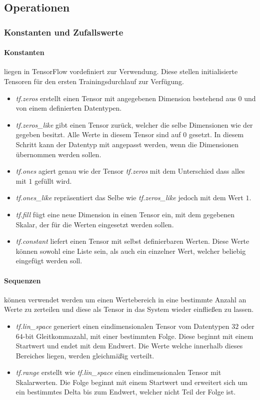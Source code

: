 \subsection{Operationen}

\subsubsection{Konstanten und Zufallswerte}

\paragraph{Konstanten} liegen in TensorFlow vordefiniert zur Verwendung.
Diese stellen initialisierte Tensoren für den ersten Trainingsdurchlauf zur Verfügung.

\begin{itemize}
	\item \textit{tf.zeros} erstellt einen Tensor mit angegebenen Dimension bestehend aus $0$ und von einem definierten Datentypen. 
	\item \textit{tf.zeros\_like} gibt einen Tensor zurück, welcher die selbe Dimensionen wie der gegeben besitzt.
	Alle Werte in diesem Tensor sind auf $0$ gesetzt.
	In diesem Schritt kann der Datentyp mit angepasst werden, wenn die Dimensionen übernommen werden sollen.
	\item \textit{tf.ones} agiert genau wie der Tensor \textit{tf.zeros} mit dem Unterschied dass alles mit $1$ gefüllt wird.
	\item \textit{tf.ones\_like} repräsentiert das Selbe wie \textit{tf.zeros\_like} jedoch mit dem Wert $1$.
	\item \textit{tf.fill} fügt eine neue Dimension in einen Tensor ein, mit dem gegebenen Skalar, der für die Werten eingesetzt werden sollen.
	\item \textit{tf.constant} liefert einen Tensor mit selbst definierbaren Werten. 
	Diese Werte können sowohl eine Liste sein, als auch ein einzelner Wert, welcher beliebig eingefügt werden soll. 
\end{itemize}

\paragraph{Sequenzen} können verwendet werden um einen Wertebereich in eine bestimmte Anzahl an Werte zu zerteilen und diese als Tensor in das System wieder einfließen zu lassen.

\begin{itemize}
	\item \textit{tf.lin\_space} generiert einen eindimensionalen Tensor vom Datentypen $32$ oder $64$-bit Gleitkommazahl, mit einer bestimmten Folge.
	Diese beginnt mit einem Startwert und endet mit dem Endwert. 
	Die Werte welche innerhalb dieses Bereiches liegen, werden gleichmäßig verteilt. 
	\item \textit{tf.range} erstellt wie \textit{tf.lin\_space} einen eindimensionalen Tensor mit Skalarwerten. 
	Die Folge beginnt mit einem Startwert und erweitert sich um ein bestimmtes Delta bis zum Endwert, welcher nicht Teil der Folge ist. 
\end{itemize}


